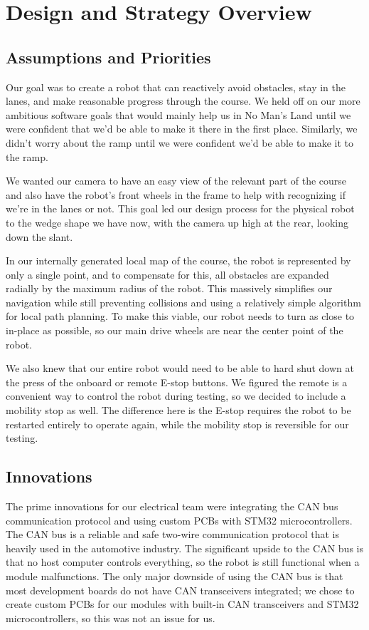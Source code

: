 \section{Design and Strategy Overview}

\subsection{Assumptions and Priorities}

Our goal was to create a robot that can reactively avoid obstacles, stay in the lanes, and make reasonable progress through the course. We held off on our more ambitious software goals that would mainly help us in No Man's Land until we were confident that we'd be able to make it there in the first place. Similarly, we didn't worry about the ramp until we were confident we'd be able to make it to the ramp.

We wanted our camera to have an easy view of the relevant part of the course and also have the robot's front wheels in the frame to help with recognizing if we're in the lanes or not. This goal led our design process for the physical robot to the wedge shape we have now, with the camera up high at the rear, looking down the slant.

In our internally generated local map of the course, the robot is represented by only a single point, and to compensate for this, all obstacles are expanded radially by the maximum radius of the robot. This massively simplifies our navigation while still preventing collisions and using a relatively simple algorithm for local path planning. To make this viable, our robot needs to turn as close to in-place as possible, so our main drive wheels are near the center point of the robot.

We also knew that our entire robot would need to be able to hard shut down at the press of the onboard or remote E-stop buttons. We figured the remote is a convenient way to control the robot during testing, so we decided to include a mobility stop as well. The difference here is the E-stop requires the robot to be restarted entirely to operate again, while the mobility stop is reversible for our testing.

\subsection{Innovations} \label{sec:innovations}
The prime innovations for our electrical team were integrating the CAN bus communication protocol and using custom PCBs with STM32 microcontrollers. The CAN bus is a reliable and safe two-wire communication protocol that is heavily used in the automotive industry. The significant upside to the CAN bus is that no host computer controls everything, so the robot is still functional when a module malfunctions. The only major downside of using the CAN bus is that most development boards do not have CAN transceivers integrated; we chose to create custom PCBs for our modules with built-in CAN transceivers and STM32 microcontrollers, so this was not an issue for us.

